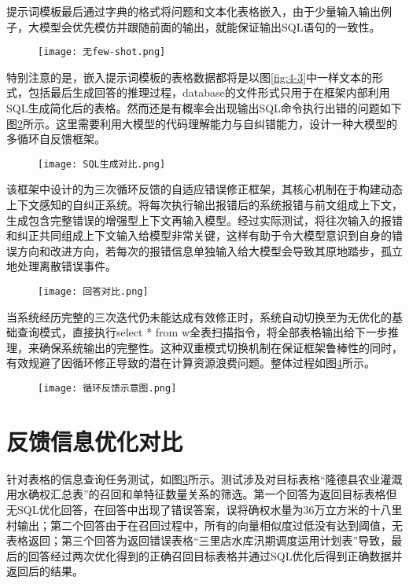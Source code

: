 提示词模板最后通过字典的格式将问题和文本化表格嵌入，由于少量输入输出例子，大模型会优先模仿并跟随前面的输出，就能保证输出SQL语句的一致性。
\begin{figure}[!htbp]
    \centering
    \texttt{[image: 无few-shot.png]}
    \label{fig:4-4}
\end{figure}
特别注意的是，嵌入提示词模板的表格数据都将是以图\ref{fig:4-3}中一样文本的形式，包括最后生成回答的推理过程，database的文件形式只用于在框架内部利用SQL生成简化后的表格。然而还是有概率会出现输出SQL命令执行出错的问题如下图\ref{fig:4-5}所示。这里需要利用大模型的代码理解能力与自纠错能力，设计一种大模型的多循环自反馈框架。
\begin{figure}[!htbp]
    \centering
    \texttt{[image: SQL生成对比.png]}
    \label{fig:4-5}
\end{figure}

该框架中设计的为三次循环反馈的自适应错误修正框架，其核心机制在于构建动态上下文感知的自纠正系统。将每次执行输出报错后的系统报错与前文组成上下文，生成包含完整错误的增强型上下文再输入模型。经过实际测试，将往次输入的报错和纠正共同组成上下文输入给模型非常关键，这样有助于令大模型意识到自身的错误方向和改进方向，若每次的报错信息单独输入给大模型会导致其原地踏步，孤立地处理离散错误事件。
\begin{figure}[!htb]
    \centering
    \texttt{[image: 回答对比.png]}
    \label{fig:4-7}
\end{figure}
当系统经历完整的三次迭代仍未能达成有效修正时，系统自动切换至为无优化的基础查询模式，直接执行select * from w全表扫描指令，将全部表格输出给下一步推理，来确保系统输出的完整性。这种双重模式切换机制在保证框架鲁棒性的同时，有效规避了因循环修正导致的潜在计算资源浪费问题。整体过程如图\ref{fig:4-6}所示。
\begin{figure}[htbp]
    \centering
    \texttt{[image: 循环反馈示意图.png]}
    \label{fig:4-6}
\end{figure}

\section{反馈信息优化对比}
针对表格的信息查询任务测试，如图\ref{fig:4-7}所示。测试涉及对目标表格“隆德县农业灌溉用水确权汇总表”的召回和单特征数量关系的筛选。第一个回答为返回目标表格但无SQL优化回答，在回答中出现了错误答案，误将确权水量为36万立方米的十八里村输出；第二个回答由于在召回过程中，所有的向量相似度过低没有达到阈值，无表格返回；第三个回答为返回错误表格“三里店水库汛期调度运用计划表”导致，最后的回答经过两次优化得到的正确召回目标表格并通过SQL优化后得到正确数据并返回后的结果。

